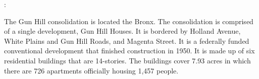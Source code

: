 :   

  

The Gun Hill consolidation is located the Bronx. The consolidation is comprised of a single development, Gun Hill Houses. It is bordered by Holland Avenue, White Plains and Gun Hill Roads, and Magenta Street.  It is a federally funded conventional development that finished construction in 1950. It is made up of six residential buildings that are 14-stories. The buildings cover 7.93  acres in which there are 726 apartments officially housing 1,457 people.   